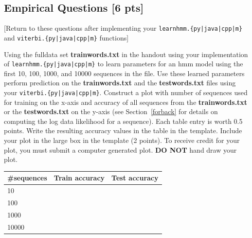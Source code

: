 \documentclass{article}
\begin{document}
\clearpage

\subsection{Empirical Questions [6 pts]}
[Return to these questions after implementing your \texttt{learnhmm.\{py|java|cpp|m\}} and \texttt{viterbi.\{py|java|cpp|m\}} functions]

Using the fulldata set \textbf{trainwords.txt} in the handout using your implementation of \texttt{learnhmm.\{py|java|cpp|m\}} to learn parameters for an hmm model using the first 10, 100, 1000, and 10000 sequences in the file.
Use these learned parameters perform prediction on the \textbf{trainwords.txt} and the \textbf{testwords.txt} files using your \texttt{viterbi.\{py|java|cpp|m\}}.
Construct a plot with number of sequences used for training on the x-axis and accuracy of all sequences from the \textbf{trainwords.txt} or the \textbf{testwords.txt} on the y-axis (see Section~\ref{forback} for details on computing the log data likelihood for a sequence). Each table entry is worth 0.5 points. 
Write the resulting accuracy values in the table in the template.
Include your plot in the large box in the template (2 points).
To receive credit for your plot, you must submit a computer generated plot.
\textbf{DO NOT} hand draw your plot.

\begin{table}[h]
    \center
    \begin{tabular}{|m{2cm}|m{3cm}|m{3cm}|}
    \hline
    \#sequences & Train accuracy & Test accuracy \\ \hline
    10         &    &  \\ \hline
    100        &    &  \\ \hline
    1000       &    &  \\ \hline
    10000      &    &  \\ \hline
    \end{tabular}
    \end{table}

 \begin{tcolorbox}[fit,height=13cm, width=17cm, blank, borderline={1pt}{-2pt}]
 \end{tcolorbox}
\end{document}
